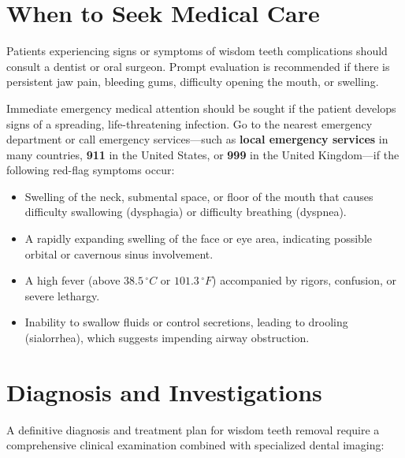 \section*{When to Seek Medical Care}
Patients experiencing signs or symptoms of wisdom teeth complications should consult a dentist or oral surgeon. Prompt evaluation is recommended if there is persistent jaw pain, bleeding gums, difficulty opening the mouth, or swelling.

Immediate emergency medical attention should be sought if the patient develops signs of a spreading, life-threatening infection. Go to the nearest emergency department or call emergency services---such as \textbf{local emergency services} in many countries, \textbf{911} in the United States, or \textbf{999} in the United Kingdom---if the following red-flag symptoms occur:
\begin{itemize}
    \item Swelling of the neck, submental space, or floor of the mouth that causes difficulty swallowing (dysphagia) or difficulty breathing (dyspnea).
    \item A rapidly expanding swelling of the face or eye area, indicating possible orbital or cavernous sinus involvement.
    \item A high fever (above $38.5\,^{\circ}C$ or $101.3\,^{\circ}F$) accompanied by rigors, confusion, or severe lethargy.
    \item Inability to swallow fluids or control secretions, leading to drooling (sialorrhea), which suggests impending airway obstruction.
\end{itemize}

\section*{Diagnosis and Investigations}
A definitive diagnosis and treatment plan for wisdom teeth removal require a comprehensive clinical examination combined with specialized dental imaging:

